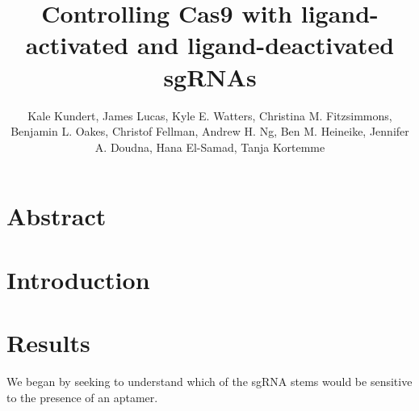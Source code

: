 \documentclass[10pt,oneside]{article}
\begin{document}
\title{Controlling Cas9 with ligand-activated and ligand-deactivated sgRNAs}
\author{Kale Kundert, James Lucas, Kyle E. Watters, Christina M. Fitzsimmons, 
Benjamin L. Oakes, Christof Fellman, Andrew H. Ng, Ben M. Heineike, Jennifer A.  
Doudna, Hana El-Samad, Tanja Kortemme}
\maketitle{}

\section{Abstract}

\section{Introduction}

\section{Results}

%




We began by seeking to understand which of the sgRNA stems would be sensitive 
to the presence of an aptamer.

  
\end{document}
